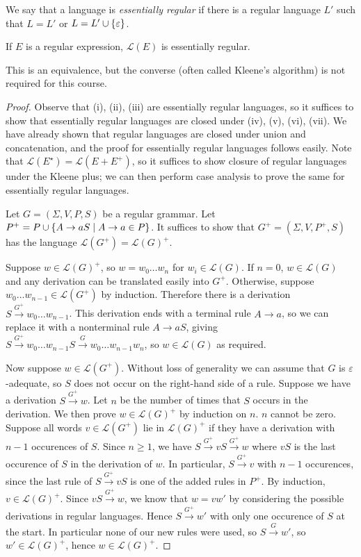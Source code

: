 We say that a language is \emph{essentially regular} if there is a regular language \( L' \) such that \( L = L' \) or \( L = L' \cup \qty{\varepsilon} \).
\begin{theorem}
	If \( E \) is a regular expression, \( \mathcal L(E) \) is essentially regular.
\end{theorem}
This is an equivalence, but the converse (often called Kleene's algorithm) is not required for this course.
\begin{proof}
	Observe that (i), (ii), (iii) are essentially regular languages, so it suffices to show that essentially regular languages are closed under (iv), (v), (vi), (vii).
	We have already shown that regular languages are closed under union and concatenation, and the proof for essentially regular languages follows easily.
	Note that \( \mathcal L(E^\star) = \mathcal L(E + E^+) \), so it suffices to show closure of regular languages under the Kleene plus; we can then perform case analysis to prove the same for essentially regular languages.

	Let \( G = (\Sigma, V, P, S) \) be a regular grammar.
	Let \( P^+ = P \cup \qty{A \to aS \mid A \to a \in P} \).
	It suffices to show that \( G^+ = (\Sigma, V, P^+, S) \) has the language \( \mathcal L(G^+) = \mathcal L(G)^+ \).

	Suppose \( w \in \mathcal L(G)^+ \), so \( w = w_0 \dots w_n \) for \( w_i \in \mathcal L(G) \).
	If \( n = 0 \), \( w \in \mathcal L(G) \) and any derivation can be translated easily into \( G^+ \).
	Otherwise, suppose \( w_0 \dots w_{n-1} \in \mathcal L(G^+) \) by induction.
	Therefore there is a derivation \( S \xrightarrow{G^+} w_0 \dots w_{n-1} \).
	This derivation ends with a terminal rule \( A \to a \), so we can replace it with a nonterminal rule \( A \to aS \), giving \( S \xrightarrow{G^+} w_0 \dots w_{n-1} S \xrightarrow{G} w_0 \dots w_{n-1} w_n \), so \( w \in \mathcal L(G) \) as required.

	Now suppose \( w \in \mathcal L(G^+) \).
	Without loss of generality we can assume that \( G \) is \( \varepsilon \)-adequate, so \( S \) does not occur on the right-hand side of a rule.
	Suppose we have a derivation \( S \xrightarrow{G^+} w \).
	Let \( n \) be the number of times that \( S \) occurs in the derivation.
	We then prove \( w \in \mathcal L(G)^+ \) by induction on \( n \).
	\( n \) cannot be zero.
	Suppose all words \( v \in \mathcal L(G^+) \) lie in \( \mathcal L(G)^+ \) if they have a derivation with \( n-1 \) occurences of \( S \).
	Since \( n \geq 1 \), we have \( S \xrightarrow{G^+} vS \xrightarrow{G^+} w \) where \( vS \) is the last occurence of \( S \) in the derivation of \( w \).
	In particular, \( S \xrightarrow{G^+} v \) with \( n - 1 \) occurences, since the last rule of \( S \xrightarrow{G^+} vS \) is one of the added rules in \( P^+ \).
	By induction, \( v \in \mathcal L(G)^+ \).
	Since \( vS \xrightarrow{G^+} w \), we know that \( w = vw' \) by considering the possible derivations in regular languages.
	Hence \( S \xrightarrow{G^+} w' \) with only one occurence of \( S \) at the start.
	In particular none of our new rules were used, so \( S \xrightarrow G w' \), so \( w' \in \mathcal L(G)^+ \), hence \( w \in \mathcal L(G)^+ \).
\end{proof}

